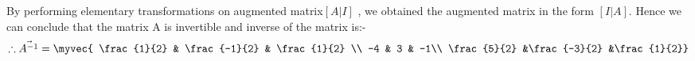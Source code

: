 \documentclass[journal,12pt,twocolumn]{IEEEtran}
\begin{document}
By performing elementary transformations on augmented matrix$ [A | I]$ , we obtained the augmented matrix in the form $ [I | A]$. 
Hence we can conclude that the matrix A is invertible and inverse of the matrix is:-
\begin{align}
\therefore\vec{A^{-1}}=\myvec { \frac{1}{2} & \frac{-1}{2} & \frac{1}{2} \\  -4 & 3 & -1\\ \frac{5}{2} &\frac{-3}{2} &\frac{1}{2}}
\end{align}
\end{document}
